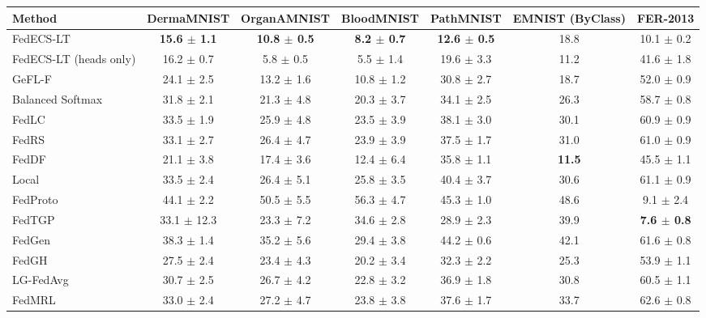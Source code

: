 \begin{tabular}{lcccccc}
\toprule
Method & DermaMNIST & OrganAMNIST & BloodMNIST & PathMNIST & EMNIST (ByClass) & FER-2013\\
\midrule
FedECS-LT & \textbf{15.6 $\pm$ 1.1} & \textbf{10.8 $\pm$ 0.5} & \textbf{8.2 $\pm$ 0.7} & \textbf{12.6 $\pm$ 0.5} & 18.8 & 10.1 $\pm$ 0.2\\
FedECS-LT (heads only) & 16.2 $\pm$ 0.7 & 5.8 $\pm$ 0.5 & 5.5 $\pm$ 1.4 & 19.6 $\pm$ 3.3 & 11.2 & 41.6 $\pm$ 1.8\\
GeFL-F & 24.1 $\pm$ 2.5 & 13.2 $\pm$ 1.6 & 10.8 $\pm$ 1.2 & 30.8 $\pm$ 2.7 & 18.7 & 52.0 $\pm$ 0.9\\
Balanced Softmax & 31.8 $\pm$ 2.1 & 21.3 $\pm$ 4.8 & 20.3 $\pm$ 3.7 & 34.1 $\pm$ 2.5 & 26.3 & 58.7 $\pm$ 0.8\\
FedLC & 33.5 $\pm$ 1.9 & 25.9 $\pm$ 4.8 & 23.5 $\pm$ 3.9 & 38.1 $\pm$ 3.0 & 30.1 & 60.9 $\pm$ 0.9\\
FedRS & 33.1 $\pm$ 2.7 & 26.4 $\pm$ 4.7 & 23.9 $\pm$ 3.9 & 37.5 $\pm$ 1.7 & 31.0 & 61.0 $\pm$ 0.9\\
FedDF & 21.1 $\pm$ 3.8 & 17.4 $\pm$ 3.6 & 12.4 $\pm$ 6.4 & 35.8 $\pm$ 1.1 & \textbf{11.5} & 45.5 $\pm$ 1.1\\
Local & 33.5 $\pm$ 2.4 & 26.4 $\pm$ 5.1 & 25.8 $\pm$ 3.5 & 40.4 $\pm$ 3.7 & 30.6 & 61.1 $\pm$ 0.9\\
FedProto & 44.1 $\pm$ 2.2 & 50.5 $\pm$ 5.5 & 56.3 $\pm$ 4.7 & 45.3 $\pm$ 1.0 & 48.6 & 9.1 $\pm$ 2.4\\
FedTGP & 33.1 $\pm$ 12.3 & 23.3 $\pm$ 7.2 & 34.6 $\pm$ 2.8 & 28.9 $\pm$ 2.3 & 39.9 & \textbf{7.6 $\pm$ 0.8}\\
FedGen & 38.3 $\pm$ 1.4 & 35.2 $\pm$ 5.6 & 29.4 $\pm$ 3.8 & 44.2 $\pm$ 0.6 & 42.1 & 61.6 $\pm$ 0.8\\
FedGH & 27.5 $\pm$ 2.4 & 23.4 $\pm$ 4.3 & 20.2 $\pm$ 3.4 & 32.3 $\pm$ 2.2 & 25.3 & 53.9 $\pm$ 1.1\\
LG-FedAvg & 30.7 $\pm$ 2.5 & 26.7 $\pm$ 4.2 & 22.8 $\pm$ 3.2 & 36.9 $\pm$ 1.8 & 30.8 & 60.5 $\pm$ 1.1\\
FedMRL & 33.0 $\pm$ 2.4 & 27.2 $\pm$ 4.7 & 23.8 $\pm$ 3.8 & 37.6 $\pm$ 1.7 & 33.7 & 62.6 $\pm$ 0.8\\
\bottomrule
\end{tabular}

